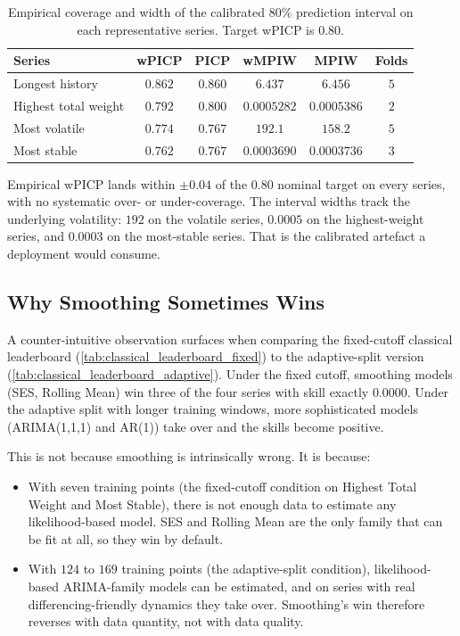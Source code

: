 \begin{table}[h]
\centering
\caption{Empirical coverage and width of the calibrated $80\%$ prediction interval on each representative series. Target wPICP is $0.80$.}
\label{tab:coverage_summary}
\begin{tabular}{l c c c c c}
\toprule
Series & wPICP & PICP & wMPIW & MPIW & Folds \\
\midrule
Longest history       & $0.862$ & $0.860$ & $6.437$       & $6.456$       & $5$ \\
Highest total weight  & $0.792$ & $0.800$ & $0.0005282$   & $0.0005386$   & $2$ \\
Most volatile         & $0.774$ & $0.767$ & $192.1$       & $158.2$       & $5$ \\
Most stable           & $0.762$ & $0.767$ & $0.0003690$   & $0.0003736$   & $3$ \\
\bottomrule
\end{tabular}
\end{table}

Empirical wPICP lands within $\pm 0.04$ of the $0.80$ nominal target on every series, with no systematic over- or under-coverage. The interval widths track the underlying volatility: $192$ on the volatile series, $0.0005$ on the highest-weight series, and $0.0003$ on the most-stable series. That is the calibrated artefact a deployment would consume.

\subsection{Why Smoothing Sometimes Wins}
\label{sec:analysis:smoothing}

A counter-intuitive observation surfaces when comparing the fixed-cutoff classical leaderboard (\cref{tab:classical_leaderboard_fixed}) to the adaptive-split version (\cref{tab:classical_leaderboard_adaptive}). Under the fixed cutoff, smoothing models (SES, Rolling Mean) win three of the four series with skill exactly $0.0000$. Under the adaptive split with longer training windows, more sophisticated models (ARIMA(1,1,1) and AR(1)) take over and the skills become positive.

This is not because smoothing is intrinsically wrong. It is because:

\begin{itemize}
  \item With seven training points (the fixed-cutoff condition on Highest Total Weight and Most Stable), there is not enough data to estimate any likelihood-based model. SES and Rolling Mean are the only family that can be fit at all, so they win by default.
  \item With $124$ to $169$ training points (the adaptive-split condition), likelihood-based ARIMA-family models can be estimated, and on series with real differencing-friendly dynamics they take over. Smoothing's win therefore reverses with data quantity, not with data quality.
\end{itemize}

